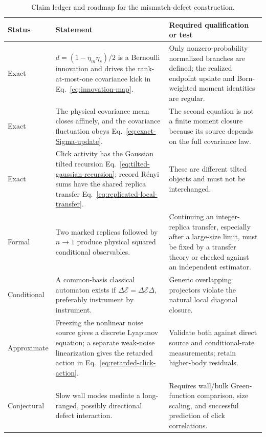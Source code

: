 \documentclass[
  aps,prx,twocolumn,superscriptaddress,longbibliography,
  nofootinbib,floatfix
]{revtex4-2}
\newcommand{\cE}{\mathcal{E}}
\theoremstyle{plain}
\theoremstyle{definition}
\begin{document}
\begin{table}[t]
\caption{Claim ledger and roadmap for the mismatch-defect construction.}
\label{tab:claim-ledger}
\begin{ruledtabular}
\begin{tabular}{p{}p{}p{}}
Status & Statement & Required qualification or test \\
\hline
Exact & \(d=(1-\eta_m\eta_s)/2\) is a Bernoulli innovation and drives the
rank-at-most-one covariance kick in Eq.~\eqref{eq:innovation-map}. & Only
nonzero-probability normalized branches are defined; the realized endpoint
update and Born-weighted moment identities are regular. \\
Exact & The physical covariance mean closes affinely, and the covariance
fluctuation obeys Eq.~\eqref{eq:exact-Sigma-update}. & The second equation is
not a finite moment closure because its source depends on the full covariance
law. \\
Exact & Click activity has the Gaussian tilted recursion
Eq.~\eqref{eq:tilted-gaussian-recursion}; record R\'enyi sums have the shared
replica transfer Eq.~\eqref{eq:replicated-local-transfer}. & These are
different tilted objects and must not be interchanged. \\
Formal & Two marked replicas followed by \(n\to1\) produce physical squared
conditional observables. & Continuing an integer-replica transfer, especially
after a large-size limit, must be fixed by a transfer theory or checked against
an independent estimator. \\
Conditional & A common-basis classical automaton exists if
\(\Delta\cE=\Delta\cE\Delta\), preferably instrument by instrument. & Generic
overlapping projectors violate the natural local diagonal closure. \\
Approximate & Freezing the nonlinear noise source gives a discrete Lyapunov
equation; a separate weak-noise linearization gives the retarded action in
Eq.~\eqref{eq:retarded-click-action}. & Validate both against direct source and
conditional-rate measurements; retain higher-body residuals. \\
Conjectural & Slow wall modes mediate a long-ranged, possibly directional
defect interaction. & Requires wall/bulk Green-function comparison, size
scaling, and successful prediction of click correlations. \\
\end{tabular}
\end{ruledtabular}
\end{table}
\end{document}
